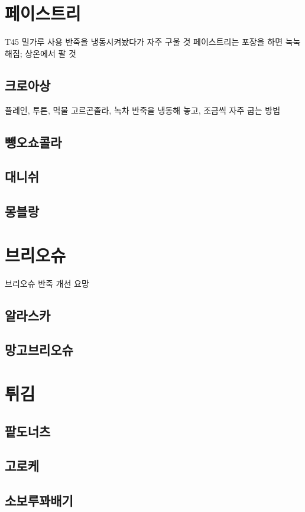 \documentclass{myproc}
\begin{document}
\section{\textcolor{red2}{페이스트리}}
\bit
\w T45 밀가루 사용
\w 반죽을 냉동시켜놨다가 자주 구울 것
\w 페이스트리는 포장을 하면 눅눅해짐; 상온에서 팔 것
\eit

\subsection{\textcolor{blue2}{크로아상}}
\bit
\w 플레인, 투톤, 먹물 고르곤졸라, 녹차
\w 반죽을 냉동해 놓고, 조금씩 자주 굽는 방법
\eit
\subsection{\textcolor{blue2}{뺑오쇼콜라}}
\subsection{\textcolor{blue2}{대니쉬}}
\subsection{\textcolor{blue2}{몽블랑}}

\section{\textcolor{red2}{브리오슈}}
\bit
\w 브리오슈 반죽 개선 요망
\eit
\subsection{\textcolor{blue2}{알라스카}}
\subsection{\textcolor{green2}{망고브리오슈}}

\section{\textcolor{red2}{튀김}}
\subsection{\textcolor{blue2}{팥도너츠}}
\subsection{\textcolor{blue2}{고로케}}
\subsection{\textcolor{blue2}{소보루꽈배기}}
\end{document}
